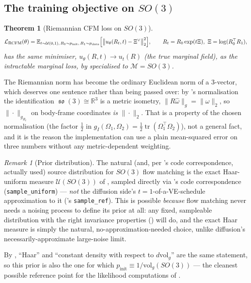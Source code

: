 \documentclass[11pt,a4paper]{report}
\newtheorem{theorem}{Theorem}[chapter]
\theoremstyle{definition}
\theoremstyle{remark}
\newtheorem{remark}[remark]{Remark}
\DeclareMathOperator{\so}{\mathfrak{so}}
\DeclareMathOperator{\tr}{tr}
\newcommand{\RR}{\mathbb R}
\newcommand{\EE}{\mathbb E}
\newcommand{\pyfunc}[1]{\texttt{#1}}
\begin{document}
\subsection{The training objective on $SO(3)$}

\begin{theorem}[Riemannian CFM loss on $SO(3)$]
\label{thm:rcfm-so3}
\[
\mathcal L_{\mathrm{RCFM}}(\theta)
=
\EE_{t\sim\mathcal U(0,1),\,R_0\sim p_{\mathrm{init}},\,R_1\sim p_{\mathrm{data}}}
\Bigl[\bigl\|u_\theta(R_t,t) - \Xi^\vee\bigr\|_2^2\Bigr],
\qquad
R_t = R_0\exp(t\Xi),\ \Xi=\log(R_0^\top R_1) ,
\]
has the same minimiser, $u_\theta(R,t)\to u_t(R)$ (the true marginal
field), as the intractable marginal loss, by
 specialised to $\mathcal M=SO(3)$.
\end{theorem}

The Riemannian norm has become the ordinary Euclidean norm of a $3$-vector,
which deserves one sentence rather than being passed over: by
's normalisation the identification
$\so(3)\cong\RR^3$ is a metric isometry, $\|R\widehat\omega\|_g=\|\omega\|_2$,
so $\|\cdot\|_{g_{R_t}}$ on body-frame coordinates \emph{is} $\|\cdot\|_2$.
That is a property of the chosen normalisation (the factor $\tfrac12$ in
$g_I(\Omega_1,\Omega_2)=\tfrac12\tr(\Omega_1^\top\Omega_2)$), not a general
fact, and it is the reason the implementation can use a plain mean-squared
error on three numbers without any metric-dependent weighting.

\begin{remark}[Prior distribution]
\label{rem:so3-fm-prior}
The natural (and, per 's code correspondence, actually
used) source distribution for $SO(3)$ flow matching is the exact
Haar-uniform measure $\mathcal U(SO(3))$ of , sampled
directly via 's code correspondence
(\pyfunc{sample\_uniform}) --- \emph{not} the diffusion side's
$t=1$-of-a-VE-schedule approximation to it
('s \pyfunc{sample\_ref}). This is possible
\emph{because} flow matching never needs a noising process to define its
prior at all: any fixed, sampleable distribution with the right invariance
properties () will do, and the
exact Haar measure is simply the natural, no-approximation-needed choice,
unlike diffusion's necessarily-approximate large-noise limit.

By , ``Haar'' and ``constant density with
respect to $d\mathrm{vol}_g$'' are the same statement, so this prior is also
the one for which $p_{\mathrm{init}}\equiv1/\mathrm{vol}_g(SO(3))$ --- the
cleanest possible reference point for the likelihood computations of
.
\end{remark}
\end{document}
